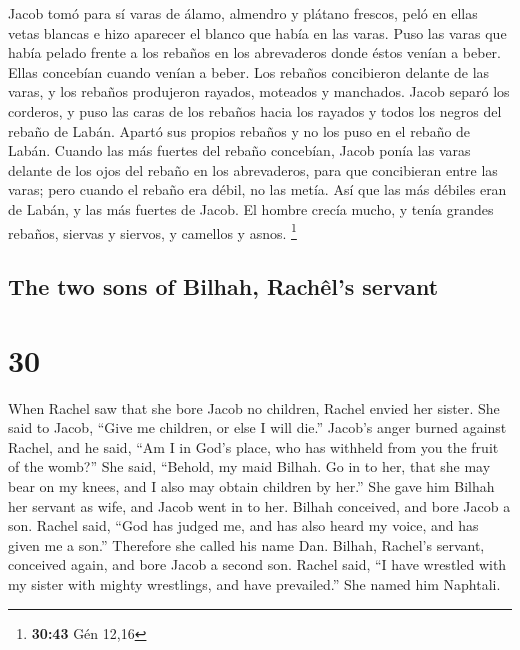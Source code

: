 \begin{paracol}{2}
 Jacob tomó para sí varas de álamo, almendro y plátano
frescos, peló en ellas vetas blancas e hizo aparecer el blanco que había
en las varas.  Puso las varas que había pelado frente a
los rebaños en los abrevaderos donde éstos venían a beber. Ellas
concebían cuando venían a beber.  Los rebaños concibieron
delante de las varas, y los rebaños produjeron rayados, moteados y
manchados.  Jacob separó los corderos, y puso las caras
de los rebaños hacia los rayados y todos los negros del rebaño de Labán.
Apartó sus propios rebaños y no los puso en el rebaño de Labán.
 Cuando las más fuertes del rebaño concebían, Jacob ponía
las varas delante de los ojos del rebaño en los abrevaderos, para que
concibieran entre las varas;  pero cuando el rebaño era
débil, no las metía. Así que las más débiles eran de Labán, y las más
fuertes de Jacob.  El hombre crecía mucho, y tenía
grandes rebaños, siervas y siervos, y camellos y asnos. \footnote{\textbf{30:43}
  Gén 12,16}

\switchcolumn
\begin{otherlanguage}{english}

\hypertarget{the-two-sons-of-bilhah-rachuxeals-servant}{%
\subsection{The two sons of Bilhah, Rachêl's
servant}\label{the-two-sons-of-bilhah-rachuxeals-servant}}

\hypertarget{section-59}{%
\section{30}\label{section-59}}

 When Rachel saw that she bore Jacob no children, Rachel
envied her sister. She said to Jacob, ``Give me children, or else I will
die.''  Jacob's anger burned against Rachel, and he said,
``Am I in God's place, who has withheld from you the fruit of the
womb?''  She said, ``Behold, my maid Bilhah. Go in to her,
that she may bear on my knees, and I also may obtain children by her.''
 She gave him Bilhah her servant as wife, and Jacob went
in to her.  Bilhah conceived, and bore Jacob a son.
 Rachel said, ``God has judged me, and has also heard my
voice, and has given me a son.'' Therefore she called his name Dan.
 Bilhah, Rachel's servant, conceived again, and bore Jacob
a second son.  Rachel said, ``I have wrestled with my
sister with mighty wrestlings, and have prevailed.'' She named him
Naphtali.


\end{otherlanguage}
\end{paracol}
